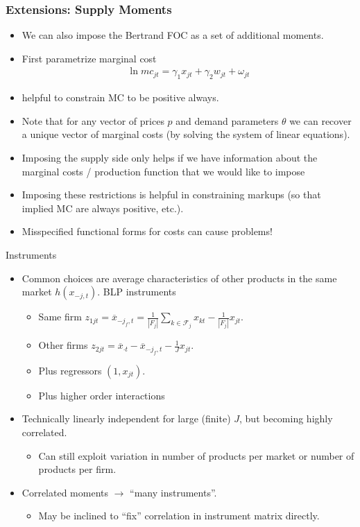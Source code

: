 \documentclass[xcolor=pdftex,dvipsnames,table,mathserif]{beamer}
\begin{document}
\begin{frame} \frametitle{Extensions: Supply Moments}
\begin{itemize}
\item We can also impose the Bertrand FOC as a set of additional moments.
\item First parametrize marginal cost
\begin{eqnarray*}
\ln mc_{jt} = \gamma_1 x_{jt} + \gamma_2 w_{jt} + \omega_{jt}
\end{eqnarray*}
\item helpful to constrain MC to be positive always.
\item Note that for any vector of prices $p$ and demand parameters $\theta$ we can recover a unique vector of marginal costs (by solving the system of linear equations).
\item Imposing the supply side only helps if we have information about the marginal costs / production function that we would like to impose
\item Imposing these restrictions is helpful in constraining markups (so that implied MC are always positive, etc.).
\item Misspecified functional forms for costs can cause problems!
\end{itemize}
\end{frame}


\begin{frame}{Instruments}
\begin{itemize}
\item Common choices are average characteristics of other products in the same market $h(x_{-j,t})$. \alert{BLP instruments}
\begin{itemize}
\item Same firm $z_{1jt} = \overline{x}_{-j_f,t} = \frac{1}{\left\vert{F_j}\right\vert}  \sum_{k \in \mathcal{F}_j} x_{kt} - \frac{1}{\left\vert{F_j}\right\vert} x_{jt}$.
\item Other firms $z_{2jt}=\overline{x}_{\cdot t} - \overline{x}_{-j_f,t} - \frac{1}{J} x_{jt}$.
\item Plus regressors $(1, x_{jt})$.
\item Plus higher order interactions 
\end{itemize}
\item Technically linearly independent for large (finite) $J$, but becoming highly correlated.
\begin{itemize}
\item Can still exploit variation in number of products per market or number of products per firm.
\end{itemize}
\item Correlated moments $\rightarrow$ ``many instruments''.
\begin{itemize}
\item May be inclined to ``fix'' correlation in instrument matrix directly.
\end{itemize}
\end{itemize}
\end{frame}
\end{document}

